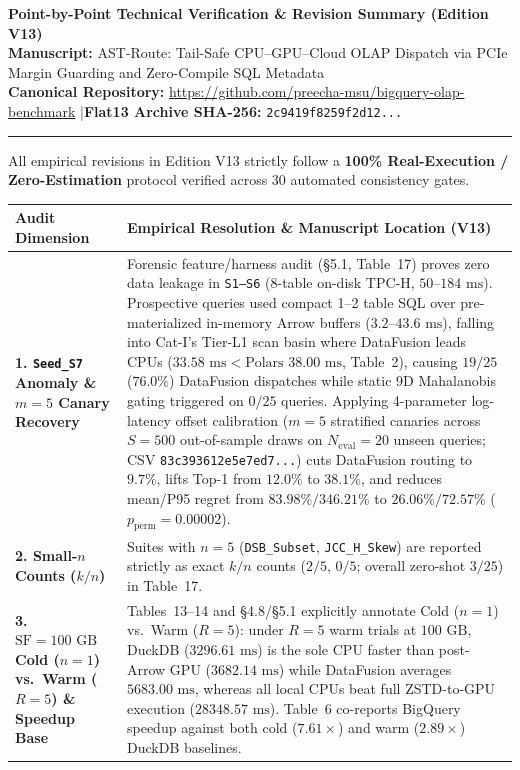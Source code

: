 \documentclass[10pt,a4paper]{article}
\begin{document}
{\Large\bfseries Point-by-Point Technical Verification \& Revision Summary (Edition V13)}\\[3pt]
\textbf{Manuscript:} AST-Route: Tail-Safe CPU--GPU--Cloud OLAP Dispatch via PCIe Margin Guarding and Zero-Compile SQL Metadata\\
\textbf{Canonical Repository:} \url{https://github.com/preecha-msu/bigquery-olap-benchmark} \quad|\quad \textbf{Flat13 Archive SHA-256:} \texttt{2c9419f8259f2d12...}
\vspace{3pt}\hrule\vspace{6pt}
All empirical revisions in Edition V13 strictly follow a \textbf{100\% Real-Execution / Zero-Estimation} protocol verified across 30 automated consistency gates.
\begin{table}[!htbp]
\centering
\footnotesize
\renewcommand{\arraystretch}{1.22}
\begin{tabular}{@{}p{}p{}@{}}
\toprule
\textbf{Audit Dimension} & \textbf{Empirical Resolution \& Manuscript Location (V13)} \\
\midrule
\textbf{1. \texttt{Seed\_S7} Anomaly \& $m=5$ Canary Recovery} & Forensic feature/harness audit (§5.1, Table~17) proves zero data leakage in \texttt{S1--S6} (8-table on-disk TPC-H, $50\text{--}184\text{ ms}$). Prospective queries used compact 1--2 table SQL over pre-materialized in-memory Arrow buffers ($3.2\text{--}43.6\text{ ms}$), falling into Cat-I's Tier-L1 scan basin where DataFusion leads CPUs ($33.58\text{ ms} < \text{Polars } 38.00\text{ ms}$, Table~2), causing $19/25$ ($76.0\%$) DataFusion dispatches while static 9D Mahalanobis gating triggered on $0/25$ queries. Applying 4-parameter log-latency offset calibration ($m=5$ stratified canaries across $S=500$ out-of-sample draws on $N_{\text{eval}}=20$ unseen queries; CSV \texttt{83c393612e5e7ed7...}) cuts DataFusion routing to $9.7\%$, lifts Top-1 from $12.0\%$ to $38.1\%$, and reduces mean/P95 regret from $83.98\%/346.21\%$ to $26.06\%/72.57\%$ ($p_{\text{perm}}=0.00002$). \\
\textbf{2. Small-$n$ Counts ($k/n$)} & Suites with $n=5$ (\texttt{DSB\_Subset}, \texttt{JCC\_H\_Skew}) are reported strictly as exact $k/n$ counts ($2/5$, $0/5$; overall zero-shot $3/25$) in Table~17. \\
\textbf{3. $\text{SF}=100\text{ GB}$ Cold ($n=1$) vs.\ Warm ($R=5$) \& Speedup Base} & Tables~13--14 and §4.8/§5.1 explicitly annotate Cold ($n=1$) vs.\ Warm ($R=5$): under $R=5$ warm trials at $100\text{ GB}$, DuckDB ($3296.61\text{ ms}$) is the sole CPU faster than post-Arrow GPU ($3682.14\text{ ms}$) while DataFusion averages $5683.00\text{ ms}$, whereas all local CPUs beat full ZSTD-to-GPU execution ($28348.57\text{ ms}$). Table~6 co-reports BigQuery speedup against both cold ($7.61\times$) and warm ($2.89\times$) DuckDB baselines. \\

\end{tabular}
\end{table}
\end{document}
